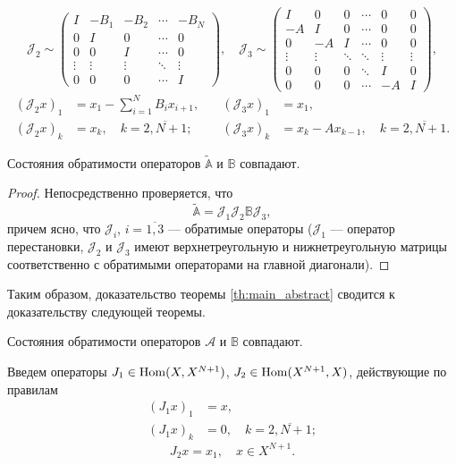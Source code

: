 \[ \mathcal J_2 \sim \begin{pmatrix}
    I & -B_1 & -B_2 & \cdots & -B_N \\
    0 & I & 0 & \cdots &  0 \\
    0 & 0 & I & \cdots &  0 \\
    \vdots & \vdots & \vdots &  \ddots & \vdots \\
    0 & 0 & 0 & \cdots & I
   \end{pmatrix}, \quad \mathcal J_3 \sim \begin{pmatrix}
    I & 0 & 0 & \cdots & 0 & 0 \\
    -A & I & 0 & \cdots & 0 & 0 \\
    0 & -A & I & \cdots & 0 & 0 \\
    \vdots & \vdots & \ddots & \ddots & \vdots & \vdots \\
    0 & 0 & 0 & \ddots & I & 0 \\
    0 & 0 & 0 & \cdots & -A & I
   \end{pmatrix}, \]
\begin{align*}
    (\mathcal J_2 x)_1 &= x_1 - \sum_{i=1}^{N} B_i x_{i + 1}, \quad &(\mathcal J_3 x)_1 &= x_1, \\
    (\mathcal J_2 x)_k &= x_k, \quad k = \overline{2,N+1}; \quad &(\mathcal J_3 x)_k &= x_k - Ax_{k-1}, \quad k = \overline{2,N+1}.
\end{align*}

\begin{lemma}
    Состояния обратимости операторов $\widetilde{\mathbb A}$ и $\mathbb B$ совпадают.
\end{lemma}

\begin{proof}
Непосредственно проверяется, что
\[ \widetilde{\mathbb A} = \mathcal J_1 \mathcal J_2 \mathbb B \mathcal J_3, \]
причем ясно, что $\mathcal J_i$, $i = \overline{1,3}$ --- обратимые операторы ($\mathcal J_1$ --- оператор перестановки, $\mathcal J_2$ и $\mathcal J_3$ имеют верхнетреугольную и нижнетреугольную матрицы соответственно с обратимыми операторами на главной диагонали).
\end{proof}

Таким образом, доказательство теоремы \ref{th:main_abstract} сводится к доказательству следующей теоремы.
\begin{theorem}\label{th:bigth}
    Состояния обратимости операторов $\mathcal A$ и $\mathbb B$ совпадают.
\end{theorem}

Введем операторы $ J_1 \hm\in \Hom(X, X^{N+1})$, $ J_2 \in \operatorname{Hom}(X^{N+1}, X)$, действующие по правилам
\begin{align*}
    ( J_1 x)_1 &= x, \\
    ( J_1 x)_k &= 0, \quad k = \overline{2,N+1};
\end{align*}
\[  J_2x = x_1, \quad x \in X^{N+1}. \]

